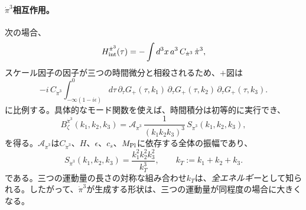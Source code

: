 \documentclass[a4paper,11pt,oneside]{article}
\theoremstyle{definition}
\numberwithin{equation}{section}
\begin{document}
\paragraph{\(\dot\pi^3\)相互作用。}
次の場合、
\begin{equation}
H_{\rm int}^{\dot\pi^3}(\tau)
=
-\int d^3x\,a^3\,C_{\dot\pi^3}\,\dot\pi^3 ,
\end{equation}
スケール因子の因子が三つの時間微分と相殺されるため、\(+\)図は
\begin{equation}
-i\,C_{\dot\pi^3}
\int_{-\infty(1-i\epsilon)}^0 d\tau\,
\partial_\tau G_{+}(\tau,k_1)\,
\partial_\tau G_{+}(\tau,k_2)\,
\partial_\tau G_{+}(\tau,k_3) .
\end{equation}
に比例する。具体的なモード関数を使えば、時間積分は初等的に実行でき、
\begin{equation}
B_\zeta^{\dot\pi^3}(k_1,k_2,k_3)
=
\mathcal A_{\dot\pi^3}\,
\frac{1}{(k_1k_2k_3)^3}\,
S_{\dot\pi^3}(k_1,k_2,k_3) ,
\end{equation}
を得る。\(\mathcal A_{\dot\pi^3}\)は\(C_{\dot\pi^3}\)、\(H\)、\(\epsilon\)、\(c_s\)、\(M_{\rm Pl}\)に依存する全体の振幅であり、
\begin{equation}
S_{\dot\pi^3}(k_1,k_2,k_3)
=
\frac{k_1^2k_2^2k_3^2}{k_{T}^3},
\qquad
k_{T}:=k_1+k_2+k_3 .
\end{equation}
である。三つの運動量の長さの対称な組み合わせ$  k_{T} $は、\textit{全エネルギー}として知られる。したがって、\(\dot\pi^3\)が生成する形状は、三つの運動量が同程度の場合に大きくなる。
\end{document}
